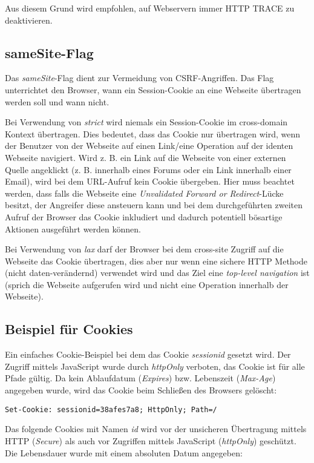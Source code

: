 Aus diesem Grund wird empfohlen, auf Webservern immer HTTP TRACE zu deaktivieren.

\subsection{sameSite-Flag}

Das \textit{sameSite}-Flag dient zur Vermeidung von CSRF-Angriffen. Das Flag unterrichtet den Browser, wann ein Session-Cookie an eine Webseite übertragen werden soll und wann nicht.

Bei Verwendung von \textit{strict} wird niemals ein Session-Cookie im cross-domain Kontext übertragen. Dies bedeutet, dass das Cookie nur übertragen wird, wenn der Benutzer von der Webseite auf einen Link/eine Operation auf der identen Webseite navigiert. Wird z. B. ein Link auf die Webseite von einer externen Quelle angeklickt (z. B. innerhalb eines Forums oder ein Link innerhalb einer Email), wird bei dem URL-Aufruf kein Cookie übergeben. Hier muss beachtet werden, dass falls die Webseite eine \textit{Unvalidated Forward or Redirect}-Lücke besitzt, der Angreifer diese ansteuern kann und bei dem durchgeführten zweiten Aufruf der Browser das Cookie inkludiert und dadurch potentiell bösartige Aktionen ausgeführt werden können.

Bei Verwendung von \textit{lax} darf der Browser bei dem cross-site Zugriff auf die Webseite das Cookie übertragen, dies aber nur wenn eine sichere HTTP Methode (nicht daten-verändernd) verwendet wird und das Ziel eine \textit{top-level navigation} ist (sprich die Webseite aufgerufen wird und nicht eine Operation innerhalb der Webseite).

\subsection{Beispiel für Cookies}

Ein einfaches Cookie-Beispiel bei dem das Cookie \textit{sessionid} gesetzt wird. Der Zugriff mittels JavaScript wurde durch \textit{httpOnly} verboten, das Cookie ist für alle Pfade gültig. Da kein Ablaufdatum (\textit{Expires}) bzw. Lebenszeit (\textit{Max-Age}) angegeben wurde, wird das Cookie beim Schließen des Browsers gelöscht:

\begin{verbatim}
Set-Cookie: sessionid=38afes7a8; HttpOnly; Path=/
\end{verbatim}

Das folgende Cookies mit Namen \textit{id} wird vor der unsicheren Übertragung mittels HTTP (\textit{Secure}) als auch vor Zugriffen mittels JavaScript (\textit{httpOnly}) geschützt. Die Lebensdauer wurde mit einem absoluten Datum angegeben:

